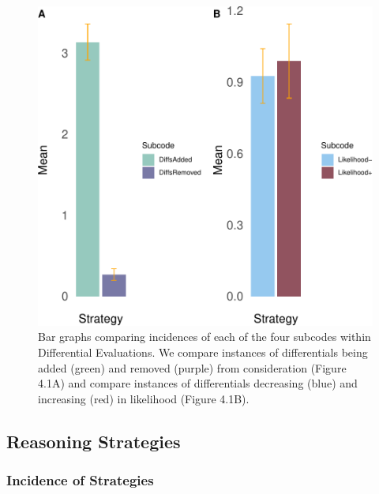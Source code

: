 \documentclass[a4paper, nobind]{templates/ociamthesis}
\begin{document}
\begin{figure}[H]

{\centering \includegraphics[width=1\linewidth]{_main_files/figure-latex/diffbarsplot-1} 

}

\caption[Think-Aloud Study: Differential Evaluations (Bar Graph)]{Bar graphs comparing incidences of each of the four subcodes within Differential Evaluations. We compare instances of differentials being added (green) and removed (purple) from consideration (Figure 4.1A) and compare instances of differentials decreasing (blue) and increasing (red) in likelihood (Figure 4.1B).}\label{fig:diffbarsplot}
\end{figure}

\subsection{Reasoning Strategies}\label{reasoning-strategies}

\subsubsection{Incidence of Strategies}\label{incidence-of-strategies}
\end{document}
